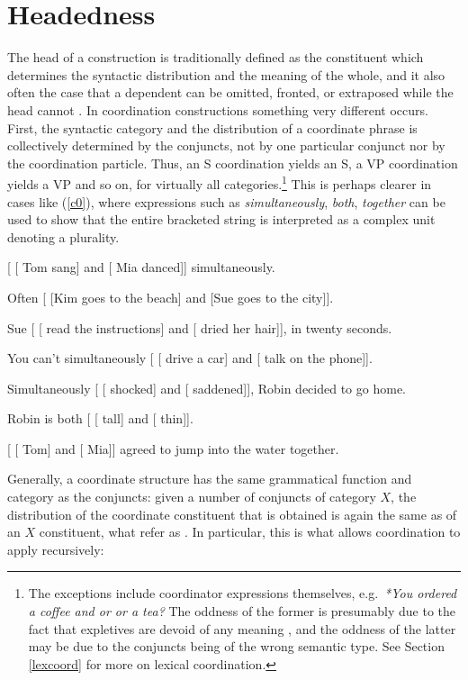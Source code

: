 {\section{Headedness}

The head of a construction is traditionally defined as the constituent which determines the syntactic distribution and the meaning of the whole, and it also often the case that a dependent can be omitted, fronted, or extraposed while the head cannot \citep{zwicky85}. In coordination constructions something very different occurs. First, the syntactic category and the distribution of a coordinate phrase is collectively determined by the conjuncts, not by one particular conjunct nor by the coordination particle. Thus, an S coordination yields an S, a VP coordination yields a VP and so on, for virtually all categories.\footnote{The exceptions include coordinator expressions themselves, e.g.\ \emph{*You ordered a coffee and or or a tea?} The oddness of the former is presumably due to the fact that expletives are devoid of any meaning
\citep{MuellerGT-Eng1}, and the oddness of the latter may be due to the conjuncts being of the wrong semantic type. See Section \ref{lexcoord} for more on lexical coordination.}
This is perhaps clearer in cases like (\ref{c0}), where
expressions such as \emph{simultaneously}, \emph{both}, 
\emph{together} can be used to show that the entire bracketed string
is interpreted as a complex unit denoting a plurality.


\eal
\label{c0}
\ex{} [ [ Tom sang] and [ Mia danced]] simultaneously.

\ex{} Often [ [Kim goes to the beach] and [Sue goes to the city]].

\ex{} Sue [ [ read the instructions] and [ dried her hair]], in twenty seconds.

\ex{} You can't simultaneously [ [ drive a car] and [ talk on the phone]].

\ex{} Simultaneously [ [ shocked] and [ saddened]], Robin decided to go home.

\ex Robin is both [ [ tall] and [ thin]].

\ex{} [ [ Tom] and [ Mia]] agreed to jump into the water together.
\zl


Generally, a coordinate structure has the same grammatical function and category as the conjuncts: given a number of conjuncts of category $X$, the distribution of the coordinate constituent that is obtained is again the same as of an $X$ constituent, what \citet[]{pullumzwicky} refer as .
In particular, this is what allows coordination to apply recursively:

}
